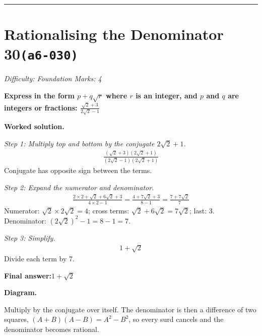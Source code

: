 \documentclass[11pt]{article}
\newcommand{\question}[1]{\par\medskip\noindent\textbf{#1}\par}
\begin{document}
\medskip\hrule

\section*{Rationalising the Denominator 30\quad\small\texttt{(a6-030)}}
\textit{Difficulty: Foundation \quad\textbar\quad Marks: 4}

\question{Express in the form \( p + q\sqrt{r} \) where \( r \) is an integer, and \( p \) and \( q \) are integers or fractions: \( \frac{\sqrt{2} + 3}{2\sqrt{2} - 1} \)}

\textbf{Worked solution.}

\textit{Step 1: Multiply top and bottom by the conjugate \( 2\sqrt{2} + 1 \).}
\[\begin{gathered}
\frac{(\sqrt{2} + 3)(2\sqrt{2} + 1)}{(2\sqrt{2} - 1)(2\sqrt{2} + 1)}
\end{gathered}\]
Conjugate has opposite sign between the terms.

\textit{Step 2: Expand the numerator and denominator.}
\[\begin{gathered}
\frac{2 \times 2 + \sqrt{2} + 6\sqrt{2} + 3}{4 \times 2 - 1} = \frac{4 + 7\sqrt{2} + 3}{8 - 1} = \frac{7 + 7\sqrt{2}}{7}
\end{gathered}\]
Numerator: \( \sqrt{2} \times 2\sqrt{2} = 4 \); cross terms: \( \sqrt{2} + 6\sqrt{2} = 7\sqrt{2} \); last: 3. Denominator: \( (2\sqrt{2})^2 - 1 = 8 - 1 = 7 \).

\textit{Step 3: Simplify.}
\[\begin{gathered}
1 + \sqrt{2}
\end{gathered}\]
Divide each term by 7.

\begin{answerbox}
\textbf{Final answer:}\quad \(\displaystyle 1 + \sqrt{2}\)
\end{answerbox}
\textbf{Diagram.}

\begin{center}
\end{center}
\small Multiply by the conjugate over itself. The denominator is then a difference of two squares, $(A+B)(A-B)=A^{2}-B^{2}$, so every surd cancels and the denominator becomes rational.\normalsize
\end{document}
